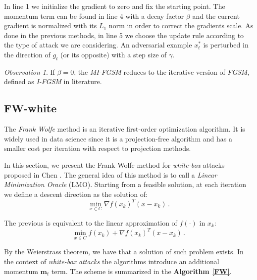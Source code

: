 \documentclass[10pt,twocolumn,letterpaper, english]{article}
\theoremstyle{definition}
\theoremstyle{plain}
\theoremstyle{plain}
\theoremstyle{plain}
\theoremstyle{plain}
\theoremstyle{remark}
\newtheorem{osservazione}{Observation}[section]
\theoremstyle{remark}
\theoremstyle{definition}
\theoremstyle{definition}
\theoremstyle{definition}
\theoremstyle{definition}
\begin{document}
In line 1 we initialize the gradient to zero and fix the starting point.
The momentum term can be found in line 4 with a decay factor $\beta$ and the current gradient is normalized with its $L_1$ norm in order to correct the gradients scale.
As done in the previous methods, in line 5 we choose the update rule according to the type of attack we are considering.
An adversarial example $x_{t}^{\ast}$ is perturbed in the direction of $g_t$ (or its opposite) with a step size of $\gamma$. 


\begin{osservazione}
If $\beta = 0$, the \textit{MI-FGSM} reduces to the iterative version of \textit{FGSM}, defined as \textit{I-FGSM} in literature.
\end{osservazione}


\subsection{FW-white}

The \textit{Frank Wolfe} method is an iterative first-order optimization algorithm. 
It is widely used in data science since it is a projection-free algorithm and has a smaller cost per iteration with respect to projection methods.

In this section, we present the Frank Wolfe method for \textit{white-box} attacks proposed in Chen \cite{frank}. 
The general idea of this method is to call a \textit{Linear Minimization Oracle} (LMO). 
Starting from a feasible solution, at each iteration we define a descent direction as the solution of:
\begin{equation*}
    \min_{x \in C}\nabla f(x_k)^T (x-x_k)\,.
\end{equation*}

The previous is equivalent to the linear approximation of $f(\cdot)$ in $x_k$:
\begin{equation*}
    \min_{x \in C} f(x_k) + \nabla f(x_k)^T (x-x_k)\,.
\end{equation*}

By the Weierstrass theorem, we have that a solution of such problem exists.
In the context of \textit{white-box attacks} the algorithms introduce an additional momentum $\textbf{m}_t$ term. 
The scheme is summarized in the \textbf{Algorithm \ref{FW}}.
\end{document}

